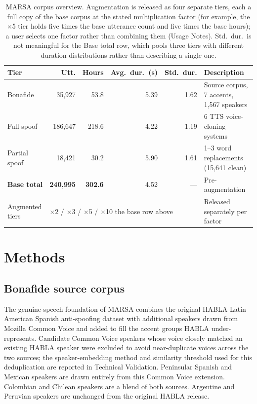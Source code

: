 \documentclass[11pt]{article}
\begin{document}
\begin{table}[t]
\centering
\caption{MARSA corpus overview. Augmentation is released as four
separate tiers, each a full copy of the base corpus at the stated
multiplication factor (for example, the $\times$5 tier holds five times
the base utterance count and five times the base hours); a user selects
one factor rather than combining them (Usage Notes). Std.\ dur.\ is not
meaningful for the Base total row, which pools three tiers with
different duration distributions rather than describing a single one.}
\label{tab:overview}
\small
\begin{tabular}{lrrrrp{3.1cm}}
\toprule
\textbf{Tier} & \textbf{Utt.} & \textbf{Hours} & \textbf{Avg.\ dur.\ (s)} & \textbf{Std.\ dur.} & \textbf{Description} \\
\midrule
Bonafide            & 35{,}927  & 53.8  & 5.39 & 1.62  & Source corpus, 7 accents, 1{,}567 speakers \\
Full spoof          & 186{,}647 & 218.6 & 4.22 & 1.19  & 6 TTS voice-cloning systems \\
Partial spoof       & 18{,}421  & 30.2  & 5.90 & 1.61  & 1--3 word replacements (15{,}641 clean) \\
\midrule
\textbf{Base total} & \textbf{240{,}995} & \textbf{302.6} & 4.52 & --- & Pre-augmentation \\
\midrule
Augmented tiers & \multicolumn{4}{l}{$\times$2 / $\times$3 / $\times$5 / $\times$10 the base row above} & Released separately per factor \\
\bottomrule
\end{tabular}
\end{table}

\section*{Methods}

\subsection*{Bonafide source corpus}

The genuine-speech foundation of MARSA combines the original HABLA
Latin American Spanish anti-spoofing dataset \citep{habla} with
additional speakers drawn from Mozilla Common Voice \citep{commonvoice}
and added to fill the accent groups HABLA under-represents. Candidate
Common Voice speakers whose voice closely matched an existing HABLA
speaker were excluded to avoid near-duplicate voices across the two
sources; the speaker-embedding method and similarity threshold used for
this deduplication are reported in Technical Validation. Peninsular
Spanish and Mexican speakers are drawn entirely from this Common Voice
extension. Colombian and Chilean speakers are a blend of both sources.
Argentine and Peruvian speakers are unchanged from the original HABLA
release.
\end{document}
